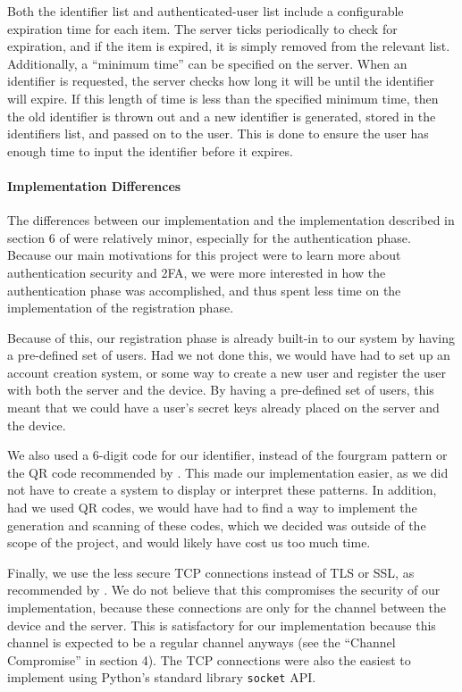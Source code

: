 \documentclass[11pt]{article}
\begin{document}
Both the identifier list and authenticated-user list include a
configurable expiration time for each item. The server ticks
periodically to check for expiration, and if the item is expired, it is
simply removed from the relevant list. Additionally, a ``minimum time''
can be specified on the server. When an identifier is requested, the
server checks how long it will be until the identifier will expire. If
this length of time is less than the specified minimum time, then the
old identifier is thrown out and a new identifier is generated, stored
in the identifiers list, and passed on to the user. This is done to
ensure the user has enough time to input the identifier before it
expires.

\paragraph{Implementation Differences}

The differences between our implementation and the implementation
described in section 6 of \cite{shirvanian2d2fa} were relatively minor,
especially for the authentication phase. Because our main motivations
for this project were to learn more about authentication security and
2FA, we were more interested in how the authentication phase was
accomplished, and thus spent less time on the implementation of the
registration phase. 

Because of this, our registration phase is already built-in to our
system by having a pre-defined set of users. Had we not done this, we
would have had to set up an account creation system, or some way to
create a new user and register the user with both the server and the
device. By having a pre-defined set of users, this meant that we could
have a user's secret keys already placed on the server and the device. 

We also used a 6-digit code for our identifier, instead of the fourgram
pattern or the QR code recommended by \cite{shirvanian2d2fa}. This made
our implementation easier, as we did not have to create a system to
display or interpret these patterns. In addition, had we used QR codes,
we would have had to find a way to implement the generation and scanning
of these codes, which we decided was outside of the scope of the
project, and would likely have cost us too much time. 

Finally, we use the less secure TCP connections instead of TLS or SSL,
as recommended by \cite{shirvanian2d2fa}. We do not believe that this
compromises the security of our implementation, because these
connections are only for the channel between the device and the server.
This is satisfactory for our implementation because this channel is
expected to be a regular channel anyways (see the ``Channel Compromise''
in section 4). The TCP connections were also the easiest to implement
using Python's standard library \texttt{socket} API. 
\end{document}
